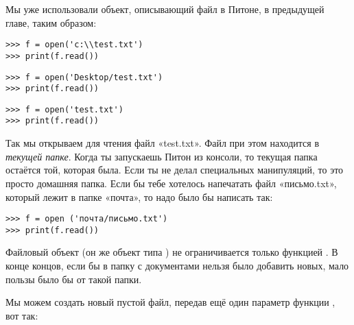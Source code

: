 Мы уже использовали объект, описывающий файл в Питоне, в предыдущей главе, таким образом:

\begin{WINDOWS}

\begin{listing}
\begin{verbatim}
>>> f = open('c:\\test.txt')
>>> print(f.read())
\end{verbatim}
\end{listing}

\end{WINDOWS}

\begin{MAC}

\begin{listing}
\begin{verbatim}
>>> f = open('Desktop/test.txt')
>>> print(f.read())
\end{verbatim}
\end{listing}

\end{MAC}

\begin{LINUX}

\begin{listing}
\begin{verbatim}
>>> f = open('test.txt')
>>> print(f.read())
\end{verbatim}
\end{listing}

Так мы открываем для чтения файл «test.txt». Файл при этом находится в \emph{текущей папке}. Когда ты запускаешь Питон из консоли, то текущая папка остаётся той, которая была. Если ты не делал специальных манипуляций, то это просто домашняя папка. Если бы тебе хотелось напечатать файл «письмо.txt», который лежит в папке «почта», то надо было бы написать так:
\begin{listing}
\begin{verbatim}
>>> f = open ('почта/письмо.txt')
>>> print(f.read())
\end{verbatim}
\end{listing}

\end{LINUX}

Файловый объект (он же объект типа ) не ограничивается только функцией . В конце концов, если бы в папку с документами нельзя было добавить новых, мало пользы было бы от такой папки.

Мы можем создать новый пустой файл, передав ещё один параметр функции , вот так:

